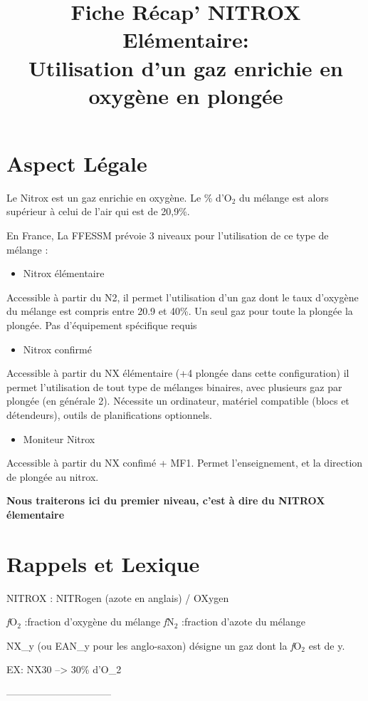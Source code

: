 \documentclass[report]{•}
\begin{document}
\title{Fiche Récap' NITROX Elémentaire: \\
Utilisation d'un gaz enrichie en oxygène en plongée}

\section{Aspect Légale}
Le Nitrox est un gaz enrichie en oxygène. Le \% d'O$_2$ du mélange est alors supérieur à celui de l'air qui est de 20,9\%.

En France, La FFESSM prévoie 3 niveaux pour l'utilisation de ce type de mélange :
\begin{itemize}
\item Nitrox élémentaire 
\end{itemize}
Accessible à partir du N2, il permet l'utilisation d'un gaz dont le taux d'oxygène du mélange est compris entre 20.9 et 40\%. Un seul gaz pour toute la plongée la plongée. Pas d'équipement spécifique requis 
\begin{itemize}
\item Nitrox confirmé
\end{itemize}
Accessible à partir du NX élémentaire (+4 plongée dans cette configuration) il permet l'utilisation de tout type de mélanges binaires, avec plusieurs gaz par plongée (en générale 2). Nécessite un ordinateur, matériel compatible (blocs et détendeurs), outils de planifications optionnels.  

\begin{itemize}
\item Moniteur Nitrox
\end{itemize}
Accessible à partir du NX confimé + MF1. Permet l'enseignement, et la direction de plongée au nitrox. 

\textbf{Nous traiterons ici du premier niveau, c'est à dire du NITROX élementaire}

\section{Rappels et Lexique}

NITROX : NITRogen (azote en anglais) / OXygen

\textit{f}O$_2$ :fraction d'oxygène du mélange
\textit{f}N$_2$ :fraction d'azote du mélange

NX_{y} (ou EAN_{y} pour les anglo-saxon) désigne un gaz dont la \textit{f}O$_2$ est de y. 

EX: NX30 --> 30\% d'O_{2}

--------------------------------
\end{document}
